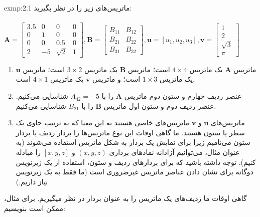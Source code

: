 {\begin{spacing}{1.5}
        \begin{exmp}{exmp:2.1}
            \Large
            ماتریس‌های زیر را در نظر بگیرید:\\\\
            $\textbf{A}=\begin{bmatrix}
                            3.5 & 0  & 0                      & 0 \\
                            0   & 1  & 0                      & 0 \\
                            0   & 0  & 0.5                    & 0 \\
                            2   & -5 & \sqrt{\displaystyle 2} & 1
            \end{bmatrix}, \textbf{B}=\begin{bmatrix}
                                          B_{11} & B_{12} \\
                                          B_{21} & B_{22} \\
                                          B_{31} & B_{32}
            \end{bmatrix}, \textbf{u}=[u_{1},u_{2},u_{3}], \textbf{v}=\begin{bmatrix}
                                                                          1                      \\
                                                                          2                      \\
                                                                          \sqrt{\displaystyle 3} \\
                                                                          \pi
            \end{bmatrix}$
            \\
            \begin{enumerate}[label=\textbf{\arabic*}.]
                \item {ماتریس $\textbf{A}$ یک ماتریس $4\times 4$ است؛
                ماتریس $\textbf{B}$ یک ماتریس $3\times 2$ است؛
                ماتریس $\textbf{u}$ یک ماتریس $1\times 3$ است؛
                و ماتریس $\textbf{v}$ یک ماتریس $4\times 1$ است.}
                \item {عنصر ردیف چهارم و ستون دوم ماتریس $\textbf{A}$ را با $A_{42}=-5$ شناسایی می‌کنیم. عنصر ردیف دوم و ستون اول ماتریس $\textbf{B}$ را با $B_{21}$ شناسایی می‌کنیم.}
                \item {ماتریس‌های $\textbf{u}$ و $\textbf{v}$ ماتریس‌های خاصی هستند به این معنا که به ترتیب حاوی یک سطر یا ستون هستند.
                ما گاهی اوقات این نوع ماتریس‌ها را بردار ردیف یا بردار ستون می‌نامیم زیرا برای نمایش یک بردار به شکل ماتریس استفاده می‌شوند
                    (به عنوان مثال، می‌توانیم آزادانه نمادهای برداری $(x, y, z)$ و $[x, y, z]$ را مبادله کنیم).
                    توجه داشته باشید که برای بردارهای ردیف و ستون، استفاده از یک زیرنویس دوگانه برای نشان دادن عناصر ماتریس غیر‌ضروری است (ما فقط به یک زیرنویس نیاز داریم.)}
            \end{enumerate}
            گاهی اوقات ما ردیف‌های یک ماتریس را به عنوان بردار در نظر میگیریم. برای مثال، ممکن است بنویسیم:


\end{exmp}
\end{spacing}}
